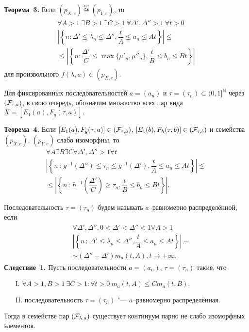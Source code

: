 \noindent\textbf{Теорема~3.}
Если
$(p_{\overline{X},e})\stackrel{\text{сл}}{\cong}(p_{\overline{Y},e})$, то
\begin{eqnarray}
\begin{aligned}
\forall{A>1}\ \exists{B>1}\ \exists{C>1}\ \forall{\Delta', \Delta ''>1}\ \forall{t>0} \\
\left|\left\{
n:\Delta '\leqslant \lambda_n \leqslant \Delta'', \dfrac{t}{A} \leqslant a_n \leqslant At
\right\}\right| \leqslant  \\ \leqslant
\left|\left\{
n:\dfrac{\Delta'}{C}\leqslant \max\{\mu'_n,\mu''_n \}, \dfrac{t}{B} \leqslant b_n \leqslant Bt
\right\}\right|
\end{aligned} \label{Finv}
\end{eqnarray}
для произвольного $f(\lambda,a) \in (p_{\overline{X},e})$.

Для фиксированных последовательностей $a=(a_n)$ и $\tau  =(\tau_n)\subset (0,1]^{\mathbb N}$ через
$({\cal F}_{\tau ,a})$, в свою очередь, обозначим множество всех
пар вида $\overline{X}=[E_1(a),F_g(\tau  ,a)]$.

\noindent\textbf{Теорема~4.}
Если $[E_1(a),F_g(\tau  ,a)]\in ({\cal F}_{\tau  ,a})$, $[E_1(b),F_h(\tau  ,b)]\in ({\cal F}_{\tau  ,b})$ и семейства
$(p_{\overline{X},e})$, $(p_{\overline{Y},e})$ слабо изоморфны, то
\begin{eqnarray*}
\forall{A}\exists{B}\exists{C}\forall{\Delta ',\Delta ''>1} \forall{t}\\
\left|\left\{
n\,:\,g^{-1}(\Delta '') \leqslant \tau_n \leqslant g^{-1}(\Delta'),\dfrac{t}{A}\leqslant a_n \leqslant At
\right\}\right|\leqslant\\ \leqslant
\left|\left\{
n\,:\,h^{-1}\left(\dfrac{\Delta'}{C}\right)\geqslant \tau_n ,\dfrac{t}{B}\leqslant b_n \leqslant Bt
\right\}\right|.
\end{eqnarray*}

Последовательность $\tau  =(\tau_n)$ будем называть $a$--равномерно распределённой, если
\begin{eqnarray}
\begin{aligned}
&&\forall{\Delta ',\Delta '',0<\Delta '<\Delta ''<1} \forall{A>1} \\
&&\left|\left\{ n\,:\, \Delta '\leqslant \lambda_n \leqslant \Delta '',
\dfrac{t}{A}\leqslant a_n\leqslant At\right\}\right|\sim \\
&&\sim
(\Delta ''-\Delta ')m_a(t,A), t\to+\infty .
\end{aligned}\nonumber
\end{eqnarray}
\noindent\textbf{Следствие~1.}
Пусть последовательности $a=(a_n)$, $\tau=(\tau_n)$ такие, что
\begin{itemize}
\item[I.] $\forall{A>1, B>1}\ \exists{C>1:}\forall{t>0}\  m_a(t,A)\leqslant C m_a(t,B)$,
\item[II.] последовательность $\tau=(\tau_n)$ "--- $a$--равномерно распределённая.
\end{itemize}
Тогда в семействе
пар $({\cal F}_{\lambda ,a})$ существует континуум парно не слабо изоморфных элементов.

